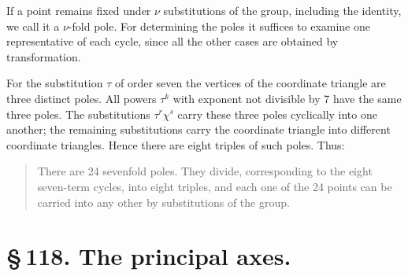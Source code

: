 \documentclass[11pt]{article}
\begin{document}
If a point remains fixed under \(\nu\) substitutions of the group, including the identity, we call it a \(\nu\)-fold pole. For determining the poles it suffices to examine one representative of each cycle, since all the other cases are obtained by transformation.

For the substitution \(\tau\) of order seven the vertices of the coordinate triangle are three distinct poles. All powers \(\tau^k\) with exponent not divisible by 7 have the same three poles. The substitutions \(\tau^r\chi^s\) carry these three poles cyclically into one another; the remaining substitutions carry the coordinate triangle into different coordinate triangles. Hence there are eight triples of such poles. Thus:

\begin{quote}
There are 24 sevenfold poles. They divide, corresponding to the eight seven-term cycles, into eight triples, and each one of the 24 points can be carried into any other by substitutions of the group.
\end{quote}

\section*{\S\,118. The principal axes.}
\end{document}

